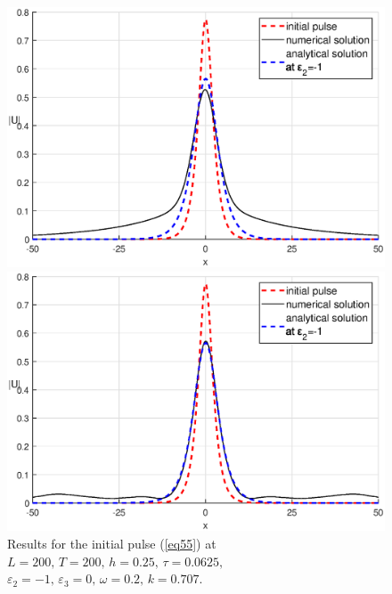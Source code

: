 \documentclass[preprint,12pt]{elsarticle}
\begin{document}
\begin{figure}[H] %
\begin{center}
\begin{minipage}[h]{0.48\linewidth}
\includegraphics[width=1\linewidth]{fig33.eps}
\end{minipage}
\hfill
\begin{minipage}[h]{0.48\linewidth}
\includegraphics[width=1\linewidth]{fig34.eps}
\end{minipage}
\end{center}
\caption{Results for the initial pulse (\ref{eq55}) at
\(L=200,\, T=200,\, h=0.25,\, \tau=0.0625,\)
\(\varepsilon_{2}=-1,\,\varepsilon_{3}=0,\, \omega=0.2,\, k=0.707\).}
\label{fig21_1}
\end{figure}
\end{document}
